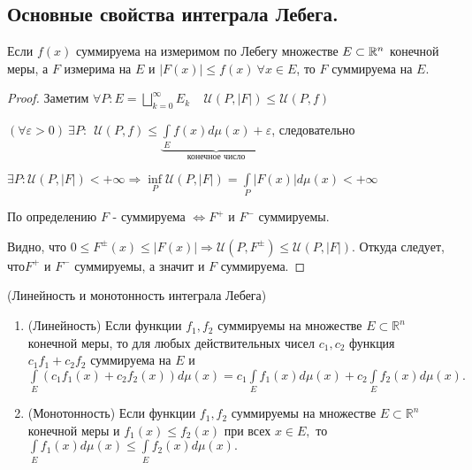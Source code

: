 \subsection{Основные свойства интеграла Лебега.}
\begin{lemma}
Если $f(x)$ суммируема на измеримом по Лебегу множестве $E \subset \R^n$ конечной меры, а $F$ измерима на $E$ и $|F(x)| \leqslant f(x)\ \forall x \in E$, то $F$ суммируема на $E$.
\end{lemma}
\begin{proof}
Заметим $\forall P: E = \bigsqcup\limits_{k=0}^{\infty}E_k\ \ \ \ \ \mathcal{U}(P, |F|) \leqslant \mathcal{U}(P, f)$

$(\forall \varepsilon > 0)\ \exists P: \ \  \mathcal{U}(P,f) \leqslant \underbrace{\int\limits_E f(x)d\mu(x)+\varepsilon}_{\text{конечное число}}$, следовательно

$\exists P: \mathcal{U}(P, |F|) < +\infty \Rightarrow \inf\limits_P \mathcal{U}(P, |F|) = \int\limits_P |F(x)|d\mu(x)<+\infty$

По определению $F$ - суммируема $\Leftrightarrow F^+ \text{ и } F^-$ суммируемы. 

Видно, что $0\leqslant F^\pm(x) \leqslant |F(x)| \Rightarrow \mathcal{U} (P,F^\pm) \leqslant \mathcal{U}(P,|F|)$. Откуда следует, что$ F^+$ и $ F^-$ суммируемы, а значит и $F$ суммируема.
\end{proof}


\begin{theorem}(Линейность и монотонность интеграла Лебега)
\begin{enumerate}
\item(Линейность) Если функции $ f_1,f_2 $ суммируемы на множестве $ E\subset\mathbb{R}^n $ конечной меры, то для любых действительных чисел $ c_1,c_2 $ функция $ c_1f_1+c_2f_2 $ суммируема на $ E $ и $ \int\limits_E\left( c_1f_1(x)+c_2f_2(x)\right) d\mu(x)=c_1\int\limits_Ef_1(x)d\mu(x)+c_2\int\limits_Ef_2(x)d\mu(x). $

\item(Монотонность) Если функции $ f_1,f_2 $ суммируемы на множестве $ E\subset\mathbb{R}^n $ конечной меры и $ f_1(x)\leqslant f_2(x) $ при всех $ x\in E, $ то $ \int\limits_Ef_1(x)d\mu(x)\leqslant\int\limits_Ef_2(x)d\mu(x). $
\end{enumerate}
\end{theorem}

